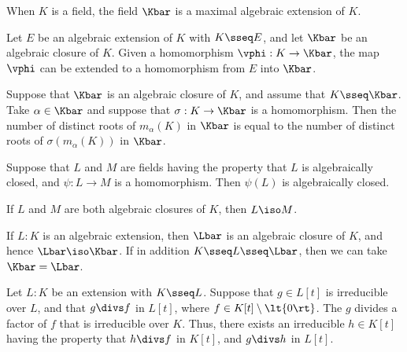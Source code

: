 \documentclass{article}
\begin{document}
  \begin{tcorollary}
    When $ K $ is a field, the field $ \Kbar $ is a maximal algebraic extension of $ K $.
  \end{tcorollary}

  \begin{ttheorem}
    Let $ E $ be an algebraic extension of $ K $ with $ K\sseq E $, and let $ \Kbar $ be an algebraic closure of $ K $.
    Given a homomorphism $ \vphi:K\to \Kbar $, the map $ \vphi $ can be extended to a homomorphism from $ E $ into $ \Kbar $.
  \end{ttheorem}

  \begin{tcorollary}
    Suppose that $ \Kbar $ is an algebraic closure of $ K $, and assume that $ K\sseq \Kbar $.
    Take $ \alpha\in \Kbar $ and suppose that $ \sigma:K\to \Kbar $ is a homomorphism.
    Then the number of distinct roots of $ m_\alpha(K) $ in $ \Kbar $ is equal to the number of distinct roots of $ \sigma(m_\alpha(K)) $ in $ \Kbar $.
  \end{tcorollary}

  \begin{tproposition}
    Suppose that $L$ and $M$ are fields having the property that $L$ is algebraically closed, and $\psi : L \to M $ is a homomorphism.
    Then $\psi(L)$ is algebraically closed.
  \end{tproposition}

  \begin{tproposition}
    If $L$ and $M$ are both algebraic closures of $K$, then $L \iso M$.
  \end{tproposition}

  \begin{tproposition}
    If $ L:K $ is an algebraic extension, then $ \Lbar $ is an algebraic closure of $ K $, and hence $ \Lbar\iso\Kbar $.
    If in addition $ K\sseq L\sseq \Lbar $, then we can take $ \Kbar = \Lbar $.
  \end{tproposition}

  \begin{tproposition}
    Let $ L:K $ be an extension with $ K\sseq L $.
    Suppose that $ g\in L[t] $ is irreducible over $ L $, and that $ g\divs f $ in $ L[t] $, where $ f\in K[t]\setminus \lt\{ 0 \rt\} $.
    The $ g $ divides a factor of $ f $ that is irreducible over $ K $.
    Thus, there exists an irreducible $ h\in K[t] $ having the property that $ h\divs f $ in $ K[t] $, and $ g\divs h $ in $ L[t] $.
  \end{tproposition}
\end{document}
